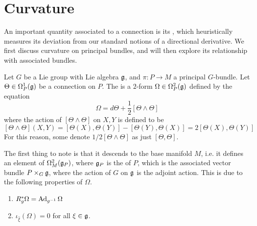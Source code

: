 %
\section{Curvature}
%
An important quantity associated to a connection is its , which
heuristically measures its deviation from our standard notions of a directional
derivative. We first discuss curvature on principal bundles, and will then
explore its relationship with associated bundles.
%
\begin{defn}
Let $G$ be a Lie group with Lie algebra $\mathfrak{g}$, and $\pi : P \to M$ a principal $G$-bundle.
Let $\Theta \in \Omega_P^1(\mathfrak{g})$ be a connection on $P$. The  is
a $2$-form $\Omega \in \Omega_P^2(\mathfrak{g})$ defined by the equation
\[
\Omega = d\Theta + \frac{1}{2}[\Theta \wedge \Theta]
\]
where the action of $[\Theta \wedge \Theta]$ on $X,Y$ is defined to be
\[
[\Theta \wedge \Theta](X,Y) = [\Theta(X), \Theta(Y)] - [\Theta(Y), \Theta(X)] =
2[\Theta(X), \Theta(Y)]
\]
For this reason, some denote $1/2[\Theta \wedge \Theta]$ as just $[\Theta, \Theta]$.
\end{defn}
%
The first thing to note is that it descends to the base manifold $M$, i.e. it defines
an element of $\Omega_M^2(\mathfrak{g}_P)$, where $\mathfrak{g}_P$ is the  of $P$,
which is the associated vector bundle $P \times_G \mathfrak{g}$, where the action of $G$ on
$\mathfrak{g}$ is the adjoint action. This is due to the following properties of $\Omega$.
%
\begin{prop} \enumbreak
\begin{enumerate}
  \item $R_g^*\Omega = \operatorname{Ad}_{g^{-1}}\Omega$
  \item $\iota_{\widehat{\xi}}(\Omega) = 0$ for all $\xi \in \mathfrak{g}$.
\end{enumerate}
\end{prop}
%
